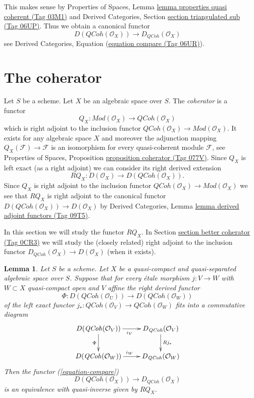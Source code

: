 \documentclass{amsart}
\theoremstyle{plain}
\newtheorem{lemma}[subsection]{Lemma}
\theoremstyle{definition}
\theoremstyle{remark}
\numberwithin{equation}{subsection}
\def\QCoh{\mathit{QCoh}}
\begin{document}
\noindent
This makes sense by
Properties of Spaces, Lemma
\href{https://stacks.math.columbia.edu/tag/03M1}{lemma properties quasi coherent (Tag 03M1)}
and
Derived Categories, Section \href{https://stacks.math.columbia.edu/tag/06UP}{section triangulated sub (Tag 06UP)}.
Thus we obtain a canonical functor
\begin{equation}
\label{equation-compare}
D(\QCoh(\mathcal{O}_X))
\longrightarrow
D_\QCoh(\mathcal{O}_X)
\end{equation}
see Derived Categories, Equation (\href{https://stacks.math.columbia.edu/tag/06UR}{equation compare (Tag 06UR)}).

\section{The coherator}
\label{section-coherator}

\noindent
Let $S$ be a scheme. Let $X$ be an algebraic space over $S$.
The {\it coherator} is a functor
$$
Q_X :
\textit{Mod}(\mathcal{O}_X)
\longrightarrow
\QCoh(\mathcal{O}_X)
$$
which is right adjoint to the inclusion functor
$\QCoh(\mathcal{O}_X) \to \textit{Mod}(\mathcal{O}_X)$.
It exists for any algebraic space $X$ and moreover the adjunction mapping
$Q_X(\mathcal{F}) \to \mathcal{F}$ is an isomorphism for every
quasi-coherent module $\mathcal{F}$, see
Properties of Spaces, Proposition
\href{https://stacks.math.columbia.edu/tag/077V}{proposition coherator (Tag 077V)}.
Since $Q_X$ is left exact (as a right adjoint) we can consider its
right derived extension
$$
RQ_X :
D(\mathcal{O}_X)
\longrightarrow
D(\QCoh(\mathcal{O}_X)).
$$
Since $Q_X$ is right adjoint to the inclusion functor
$\QCoh(\mathcal{O}_X) \to \textit{Mod}(\mathcal{O}_X)$
we see that $RQ_X$ is right adjoint to the canonical functor
$D(\QCoh(\mathcal{O}_X)) \to D(\mathcal{O}_X)$ by
Derived Categories, Lemma \href{https://stacks.math.columbia.edu/tag/09T5}{lemma derived adjoint functors (Tag 09T5)}.

\medskip\noindent
In this section we will study the functor $RQ_X$. In
Section \href{https://stacks.math.columbia.edu/tag/0CR3}{section better coherator (Tag 0CR3)}
we will study the (closely related) right adjoint to the inclusion functor
$D_\QCoh(\mathcal{O}_X) \to D(\mathcal{O}_X)$ (when it exists).



\begin{lemma}
\label{lemma-argument-proves}
Let $S$ be a scheme. Let $X$ be a quasi-compact and quasi-separated
algebraic space over $S$. Suppose that for every \'etale morphism
$j : V \to W$ with $W \subset X$ quasi-compact open and $V$ affine
the right derived functor
$$
\Phi : D(\QCoh(\mathcal{O}_U)) \to D(\QCoh(\mathcal{O}_W))
$$
of the left exact functor
$j_* : \QCoh(\mathcal{O}_V) \to \QCoh(\mathcal{O}_W)$
fits into a commutative diagram
$$
\xymatrix{
D(\QCoh(\mathcal{O}_V)) \ar[d]_\Phi \ar[r]_{i_V} &
D_\QCoh(\mathcal{O}_V) \ar[d]^{Rj_*} \\
D(\QCoh(\mathcal{O}_W)) \ar[r]^{i_W} &
D_\QCoh(\mathcal{O}_W)
}
$$
Then the functor (\ref{equation-compare})
$$
D(\QCoh(\mathcal{O}_X))
\longrightarrow
D_\QCoh(\mathcal{O}_X)
$$
is an equivalence with quasi-inverse given by $RQ_X$.
\end{lemma}
\end{document}
